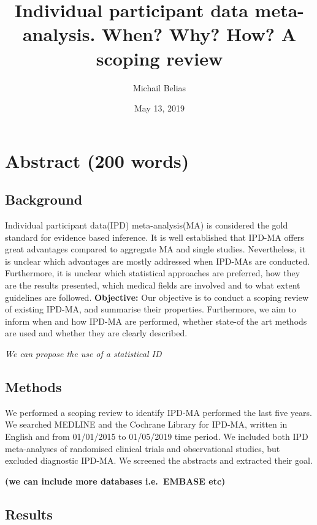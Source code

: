 \documentclass[]{article}
\title{Individual participant data meta-analysis. When? Why? How? A scoping
review}
\author{Michail Belias}
\date{May 13, 2019}
\begin{document}
\maketitle

\hypertarget{abstract-200-words}{%
\section{Abstract (200 words)}\label{abstract-200-words}}

\hypertarget{background}{%
\subsection{Background}\label{background}}

Individual participant data(IPD) meta-analysis(MA) is considered the
gold standard for evidence based inference. It is well established that
IPD-MA offers great advantages compared to aggregate MA and single
studies. Nevertheless, it is unclear which advantages are mostly
addressed when IPD-MAs are conducted. Furthermore, it is unclear which
statistical approaches are preferred, how they are the results
presented, which medical fields are involved and to what extent
guidelines are followed. \textbf{Objective:} Our objective is to conduct
a scoping review of existing IPD-MA, and summarise their properties.
Furthermore, we aim to inform when and how IPD-MA are performed, whether
state-of the art methods are used and whether they are clearly
described.

\emph{We can propose the use of a statistical ID}

\hypertarget{methods}{%
\subsection{Methods}\label{methods}}

We performed a scoping review to identify IPD-MA performed the last five
years. We searched MEDLINE and the Cochrane Library for IPD-MA, written
in English and from 01/01/2015 to 01/05/2019 time period. We included
both IPD meta-analyses of randomised clinical trials and observational
studies, but excluded diagnostic IPD-MA. We screened the abstracts and
extracted their goal.

\textbf{(we can include more databases i.e.~EMBASE etc)}

\hypertarget{results}{%
\subsection{Results}\label{results}}
\end{document}
